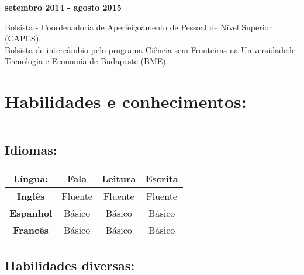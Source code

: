 \documentclass[11pt]{article}
\begin{document}
    \textbf{setembro 2014 - agosto 2015}
    \begin{addmargin}{0.5cm}
        Bolsista - Coordenadoria de Aperfeiçoamento de Pessoal de Nível Superior (CAPES). \\
        Bolsista de intercâmbio pelo programa Ciência sem Fronteiras na Universidadede Tecnologia e Economia de Budapeste (BME). 
\end{addmargin}

\newpage
\section{Habilidades e conhecimentos:}
\hrule \vspace{0.1cm}

\subsection{Idiomas:}
\begin{center}
\begin{tabular}{c | c | c | c}
\hline
\textbf{Língua:} & Fala & Leitura & Escrita \\
\hline
\hline
\textbf{Inglês} &  Fluente & Fluente & Fluente  \\
\hline
\textbf{Espanhol} & Básico & Básico & Básico \\
\hline
\textbf{Francês} & Básico & Básico & Básico \\
\hline
\end{tabular}
\end{center}


\subsection{Habilidades diversas:}
\end{document}
